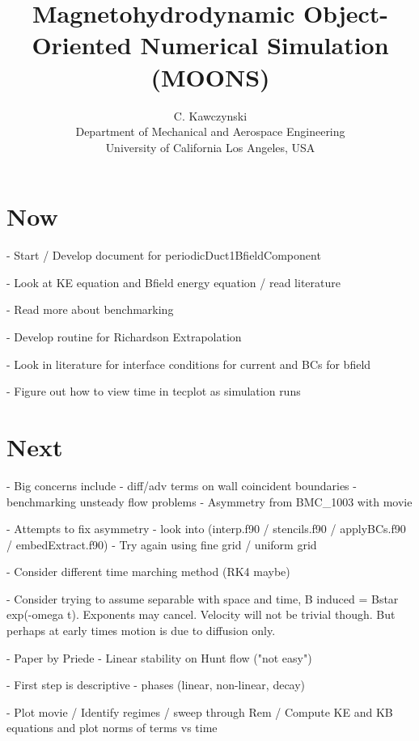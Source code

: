 \documentclass[11pt]{article}
\begin{document}
\doublespacing
\title{Magnetohydrodynamic Object-Oriented Numerical Simulation (MOONS)}
\author{C. Kawczynski \\
Department of Mechanical and Aerospace Engineering \\
University of California Los Angeles, USA\\
}
\maketitle

\section{Now}

- Start / Develop document for periodicDuct1BfieldComponent

- Look at KE equation and Bfield energy equation / read literature

- Read more about benchmarking

- Develop routine for Richardson Extrapolation

- Look in literature for interface conditions for current and BCs for bfield

- Figure out how to view time in tecplot as simulation runs

\section{Next}

- Big concerns include 
	- diff/adv terms on wall coincident boundaries
	- benchmarking unsteady flow problems
	- Asymmetry from BMC\_1003 with movie

- Attempts to fix asymmetry
	- look into (interp.f90 / stencils.f90 / applyBCs.f90 / embedExtract.f90)
	- Try again using fine grid / uniform grid

- Consider different time marching method (RK4 maybe)

- Consider trying to assume separable with space and time, B induced = Bstar exp(-omega t). Exponents may cancel. Velocity will not be trivial though. But perhaps at early times motion is due to diffusion only.

- Paper by Priede - Linear stability on Hunt flow ("not easy")

- First step is descriptive - phases (linear, non-linear, decay)

- Plot movie / Identify regimes / sweep through Rem / Compute KE and KB equations and plot norms of terms vs time
\end{document}
